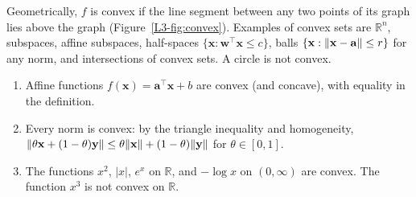 Geometrically, $f$ is convex if the line segment between any two points of its graph lies above the graph (Figure~\ref{L3-fig:convex}). Examples of convex sets are $\mathbb{R}^n$, subspaces, affine subspaces, half-spaces $\{\mathbf{x} : \mathbf{w}^\top\mathbf{x} \leq c\}$, balls $\{\mathbf{x} : \lVert \mathbf{x} - \mathbf{a} \rVert \leq r\}$ for any norm, and intersections of convex sets. A circle is not convex.

\begin{example}\label{L3-ex:convex-functions}
    \begin{enumerate}
        \item Affine functions $f(\mathbf{x}) = \mathbf{a}^\top\mathbf{x} + b$ are convex (and concave), with equality in the definition.
        \item Every norm is convex: by the triangle inequality and homogeneity, $\lVert \theta\mathbf{x} + (1 - \theta)\mathbf{y} \rVert \leq \theta\lVert \mathbf{x} \rVert + (1 - \theta)\lVert \mathbf{y} \rVert$ for $\theta \in [0, 1]$.
        \item The functions $x^2$, $|x|$, $e^x$ on $\mathbb{R}$, and $-\log x$ on $(0, \infty)$ are convex. The function $x^3$ is not convex on $\mathbb{R}$.
    \end{enumerate}
\end{example}

